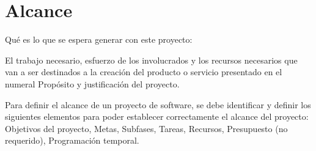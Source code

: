 \section{Alcance}
Qué es lo que se espera generar con este proyecto: 

El trabajo necesario, esfuerzo de los involucrados y los recursos necesarios que van a ser destinados a la creación del  producto o servicio presentado en el numeral Propósito y justificación del proyecto.

Para definir el alcance de un proyecto de software, se debe identificar y definir los siguientes elementos para poder establecer correctamente el alcance del proyecto: Objetivos del proyecto, Metas, Subfases, Tareas, Recursos, Presupuesto (no requerido), Programación temporal. 